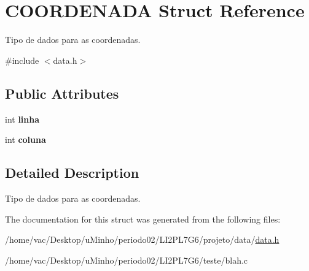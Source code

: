 \hypertarget{structCOORDENADA}{}\section{C\+O\+O\+R\+D\+E\+N\+A\+DA Struct Reference}
\label{structCOORDENADA}


Tipo de dados para as coordenadas.  




{\ttfamily \#include $<$data.\+h$>$}

\subsection*{Public Attributes}
\begin{DoxyCompactItemize}
\item 
\mbox{\label{structCOORDENADA_aefe14bcc5a066ac3b21500cc3d28c06f}} 
int {\bfseries linha}
\item 
\mbox{\label{structCOORDENADA_adfbc8d4856ce807139fdf62e00aed29a}} 
int {\bfseries coluna}
\end{DoxyCompactItemize}


\subsection{Detailed Description}
Tipo de dados para as coordenadas. 

The documentation for this struct was generated from the following files\+:\begin{DoxyCompactItemize}
\item 
/home/vac/\+Desktop/u\+Minho/periodo02/\+L\+I2\+P\+L7\+G6/projeto/data/\hyperlink{data_8h}{data.\+h}\item 
/home/vac/\+Desktop/u\+Minho/periodo02/\+L\+I2\+P\+L7\+G6/teste/blah.\+c\end{DoxyCompactItemize}
